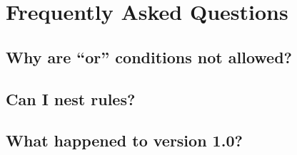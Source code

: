 \chapter{Frequently Asked Questions}
\label{faq}

\section{Why are ``or'' conditions not allowed?}

\section{Can I nest rules?}

\section{What happened to version 1.0?}
